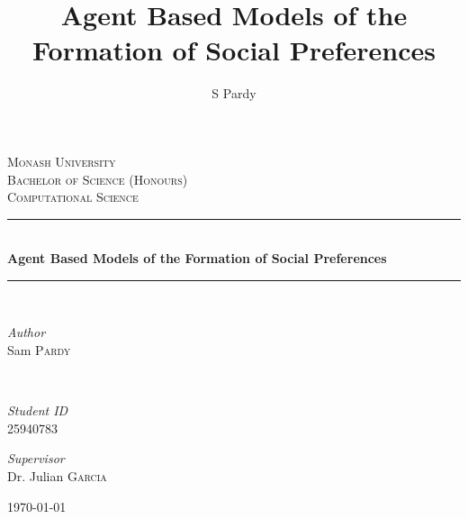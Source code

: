 \documentclass[11pt]{book}
\title{Agent Based Models of the Formation of Social Preferences}
\author{S Pardy}
\begin{document}
\begin{titlepage}
	\newcommand{\HRule}{\rule{\linewidth}{0.5mm}} %
	
	\center %
	
	
	\textsc{\LARGE Monash University}\\[1.5cm]	
	\textsc{\Large Bachelor of Science (Honours)}\\[0.5cm] %
	
	\textsc{\large Computational Science}\\[0.5cm] %
	
	
	\HRule\\[0.4cm]
	
	{\huge\bfseries Agent Based Models of the Formation of Social Preferences}\\[0.4cm]
	
	\HRule\\[1.5cm]
	
	
	\begin{minipage}{0.4\textwidth}
		\begin{flushleft}
			\large
			\textit{Author}\\
			Sam \textsc{Pardy}
		\end{flushleft}
	\end{minipage}
	~
	\begin{minipage}{0.4\textwidth}
		\begin{flushright}
			\large 
			\textit{Student ID}\\
		25940783   
		\end{flushright}
	\end{minipage}
	\vfill
	\vfill
	{\large
	\textit{Supervisor}\\
	Dr. Julian \textsc{Garcia}}
	
	
	\vfill\vfill\vfill %
	
	{\large\today} %

	\vfill %
	
\end{titlepage}
\end{document}
